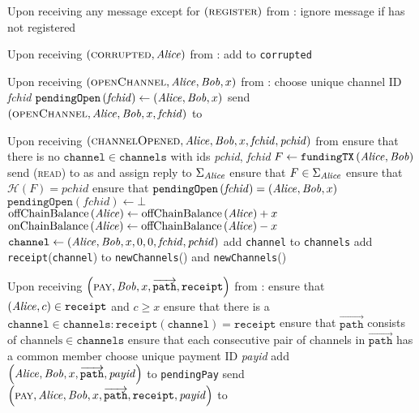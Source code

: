 \begin{functionality}{\fpaynet}
\begin{algorithmic}[1]
    \State Upon receiving any message except for
    $\left(\textsc{register}\right)$ from \alice:
    \Indent
      \State ignore message if \alice{} has not registered
    \EndIndent
    \State

    \State Upon receiving $\left(\textsc{corrupted}, \mathit{Alice}\right)$ from
    \simulator:
    \Indent
      \State add \alice{} to \texttt{corrupted}
    \EndIndent
    \State

    \State Upon receiving $\left(\textsc{openChannel}, \mathit{Alice}, \mathit{Bob}, x\right)$
    from \alice:
    \Indent
      \State choose unique channel ID \textit{fchid}
      \State $\mathtt{pendingOpen}\left(\mathit{fchid}\right) \gets
      \left(\mathit{Alice}, \mathit{Bob}, x\right)$
      \State send $\left(\textsc{openChannel}, \mathit{Alice}, \mathit{Bob}, x,
      \mathit{fchid}\right)$ to \simulator
    \EndIndent
    \State

    \State Upon receiving $\left(\textsc{channelOpened}, \mathit{Alice}, \mathit{Bob}, x,
    \mathit{fchid}, \mathit{pchid}\right)$ from \simulator
    \Indent
      \State ensure that there is no $\mathtt{channel} \in \mathtt{channels}$
      with ids \textit{pchid}, \textit{fchid}
      \State $F \gets \mathtt{fundingTX}\left(\mathit{Alice}, \mathit{Bob}\right)$
      \State send (\textsc{read}) to \ledger{} as \alice{} and assign reply to
      $\Sigma_{\mathit{Alice}}$
      \State ensure that $F \in \Sigma_{\mathit{Alice}}$
      \State ensure that $\mathcal{H}\left(F\right) = \mathit{pchid}$
      \State ensure that $\mathtt{pendingOpen}\left(\mathit{fchid}\right) =
      \left(\mathit{Alice}, \mathit{Bob}, x\right)$
      \State $\mathtt{pendingOpen}\left(\mathit{fchid}\right) \gets \bot$
      \State $\mathrm{offChainBalance}\left(\mathit{Alice}\right) \gets
      \mathrm{offChainBalance}\left(\mathit{Alice}\right) + x$ 
      \State $\mathrm{onChainBalance}\left(\mathit{Alice}\right) \gets
      \mathrm{offChainBalance}\left(\mathit{Alice}\right) - x$
      \State $\mathtt{channel} \gets \left(\mathit{Alice}, \mathit{Bob}, x, 0, 0,
      \mathit{fchid}, \mathit{pchid}\right)$
      \State add \texttt{channel} to \texttt{channels}
      \State add \texttt{receipt}(\texttt{channel}) to
      \texttt{newChannels}(\alice) and \texttt{newChannels}(\bob)
    \EndIndent
    \State

    \State Upon receiving $\left(\textsc{pay}, \mathit{Bob}, x,
    \overrightarrow{\mathtt{path}}, \mathtt{receipt}\right)$ from \alice:
    \Indent
      \State ensure that $\left(\mathit{Alice}, c\right) \in \mathtt{receipt}$ and $c
      \geq x$
      \State ensure that there is a $\mathtt{channel} \in \mathtt{channels} :
      \mathtt{receipt}\left(\mathtt{channel}\right) = \mathtt{receipt}$
      \State ensure that $\overrightarrow{\mathtt{path}}$ consists of
      $\mathrm{channels} \in \mathtt{channels}$
      \State ensure that each consecutive pair of channels in
      $\overrightarrow{\mathtt{path}}$ has a common member
      \State choose unique payment ID \textit{payid}
      \State add $\left(\mathit{Alice}, \mathit{Bob}, x, \overrightarrow{\mathtt{path}},
      \mathit{payid}\right)$ to \texttt{pendingPay}
      \State send $\left(\textsc{pay}, \mathit{Alice}, \mathit{Bob}, x,
      \overrightarrow{\mathtt{path}}, \mathtt{receipt}, \mathit{payid}\right)$
      to \simulator
    \EndIndent
    \State


\end{algorithmic}
\end{functionality}
